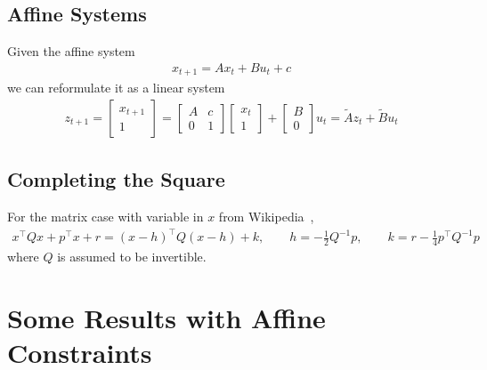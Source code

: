 \documentclass[12pt]{article}
\begin{document}
\subsection{Affine Systems}
Given the affine system
\begin{align*}
  x_{t + 1} = A x_t + B u_t + c
\end{align*}
we can reformulate it as a linear system
\begin{align}
  z_{t + 1}
    = \begin{bmatrix} x_{t + 1} \\ 1 \end{bmatrix}
    = \begin{bmatrix} A & c \\ 0 & 1 \end{bmatrix}
      \begin{bmatrix} x_t \\ 1 \end{bmatrix}
      + \begin{bmatrix} B \\ 0 \end{bmatrix}
        u_t
    = \tilde{A} z_t + \tilde{B} u_t
    \label{eqn:affine-system}
\end{align}

\subsection{Completing the Square}
For the matrix case with variable in \(x\)
from Wikipedia~\cite{wiki2020square},
\begin{align}
  x^\top Q x + p^\top x + r
    = (x - h)^\top Q (x - h) + k,
    \qquad h = - \frac{1}{2} Q^{-1} p,
    \qquad k = r - \frac{1}{4} p^\top Q^{-1} p
    \label{eqn:matrix-square}
\end{align}
where \(Q\) is assumed to be invertible.


\section{Some Results with Affine Constraints}
\end{document}
